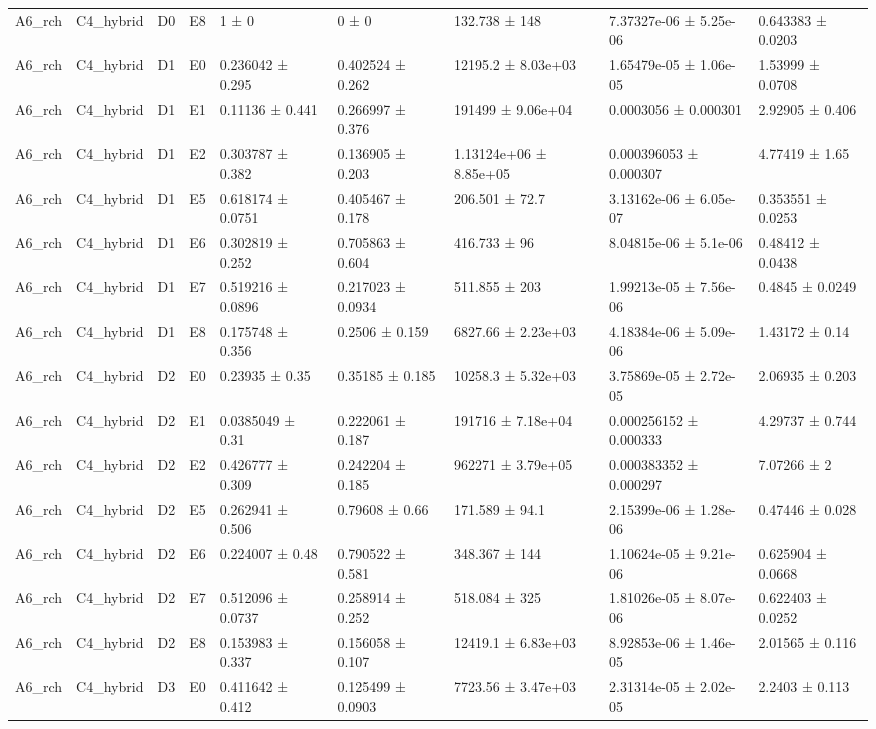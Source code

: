\begin{table}
\begin{tabular}{lllllllll}
A6\_rch & C4\_hybrid & D0 & E8 & 1 ± 0 & 0 ± 0 & 132.738 ± 148 & 7.37327e-06 ± 5.25e-06 & 0.643383 ± 0.0203 \\
A6\_rch & C4\_hybrid & D1 & E0 & 0.236042 ± 0.295 & 0.402524 ± 0.262 & 12195.2 ± 8.03e+03 & 1.65479e-05 ± 1.06e-05 & 1.53999 ± 0.0708 \\
A6\_rch & C4\_hybrid & D1 & E1 & 0.11136 ± 0.441 & 0.266997 ± 0.376 & 191499 ± 9.06e+04 & 0.0003056 ± 0.000301 & 2.92905 ± 0.406 \\
A6\_rch & C4\_hybrid & D1 & E2 & 0.303787 ± 0.382 & 0.136905 ± 0.203 & 1.13124e+06 ± 8.85e+05 & 0.000396053 ± 0.000307 & 4.77419 ± 1.65 \\
A6\_rch & C4\_hybrid & D1 & E5 & 0.618174 ± 0.0751 & 0.405467 ± 0.178 & 206.501 ± 72.7 & 3.13162e-06 ± 6.05e-07 & 0.353551 ± 0.0253 \\
A6\_rch & C4\_hybrid & D1 & E6 & 0.302819 ± 0.252 & 0.705863 ± 0.604 & 416.733 ± 96 & 8.04815e-06 ± 5.1e-06 & 0.48412 ± 0.0438 \\
A6\_rch & C4\_hybrid & D1 & E7 & 0.519216 ± 0.0896 & 0.217023 ± 0.0934 & 511.855 ± 203 & 1.99213e-05 ± 7.56e-06 & 0.4845 ± 0.0249 \\
A6\_rch & C4\_hybrid & D1 & E8 & 0.175748 ± 0.356 & 0.2506 ± 0.159 & 6827.66 ± 2.23e+03 & 4.18384e-06 ± 5.09e-06 & 1.43172 ± 0.14 \\
A6\_rch & C4\_hybrid & D2 & E0 & 0.23935 ± 0.35 & 0.35185 ± 0.185 & 10258.3 ± 5.32e+03 & 3.75869e-05 ± 2.72e-05 & 2.06935 ± 0.203 \\
A6\_rch & C4\_hybrid & D2 & E1 & 0.0385049 ± 0.31 & 0.222061 ± 0.187 & 191716 ± 7.18e+04 & 0.000256152 ± 0.000333 & 4.29737 ± 0.744 \\
A6\_rch & C4\_hybrid & D2 & E2 & 0.426777 ± 0.309 & 0.242204 ± 0.185 & 962271 ± 3.79e+05 & 0.000383352 ± 0.000297 & 7.07266 ± 2 \\
A6\_rch & C4\_hybrid & D2 & E5 & 0.262941 ± 0.506 & 0.79608 ± 0.66 & 171.589 ± 94.1 & 2.15399e-06 ± 1.28e-06 & 0.47446 ± 0.028 \\
A6\_rch & C4\_hybrid & D2 & E6 & 0.224007 ± 0.48 & 0.790522 ± 0.581 & 348.367 ± 144 & 1.10624e-05 ± 9.21e-06 & 0.625904 ± 0.0668 \\
A6\_rch & C4\_hybrid & D2 & E7 & 0.512096 ± 0.0737 & 0.258914 ± 0.252 & 518.084 ± 325 & 1.81026e-05 ± 8.07e-06 & 0.622403 ± 0.0252 \\
A6\_rch & C4\_hybrid & D2 & E8 & 0.153983 ± 0.337 & 0.156058 ± 0.107 & 12419.1 ± 6.83e+03 & 8.92853e-06 ± 1.46e-05 & 2.01565 ± 0.116 \\
A6\_rch & C4\_hybrid & D3 & E0 & 0.411642 ± 0.412 & 0.125499 ± 0.0903 & 7723.56 ± 3.47e+03 & 2.31314e-05 ± 2.02e-05 & 2.2403 ± 0.113 \\

\end{tabular}
\end{table}
